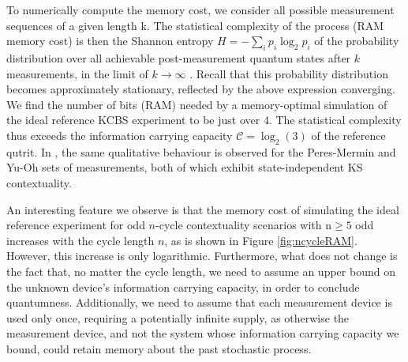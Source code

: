 To numerically compute the memory cost, we consider all possible measurement sequences of a given length k. The statistical complexity of the process (RAM memory cost) is then the Shannon entropy $H=-\sum_ip_i\log_2p_i$ of the probability distribution over all achievable post-measurement quantum states after $k$ measurements, in the limit of $k\rightarrow\infty$ \cite{Cabello2018,Barnett2015}. Recall that this probability distribution becomes approximately stationary, reflected by the above expression converging. We find the number of bits (RAM) needed by a memory-optimal simulation of the ideal reference KCBS experiment to be just over 4. The statistical complexity thus exceeds the information carrying capacity $\mathcal{C}=\log_2(3)$ of the reference qutrit. In \cite{Cabello2018}, the same qualitative behaviour is observed for the Peres-Mermin and Yu-Oh sets of measurements, both of which exhibit state-independent KS contextuality. 

An interesting feature we observe is that the memory cost of simulating the ideal reference experiment for odd $n$-cycle contextuality scenarios with $\text{n}\geq5$ odd increases with the cycle length $n$, as is shown in Figure \ref{fig:ncycleRAM}. However, this increase is only logarithmic. Furthermore, what does not change is the fact that, no matter the cycle length, we need to assume an upper bound on the unknown device's information carrying capacity, in order to conclude quantumness. Additionally, we need to assume that each measurement device is used only once, requiring a potentially infinite supply, as otherwise the measurement device, and not the system whose information carrying capacity we bound, could retain memory about the past stochastic process.

